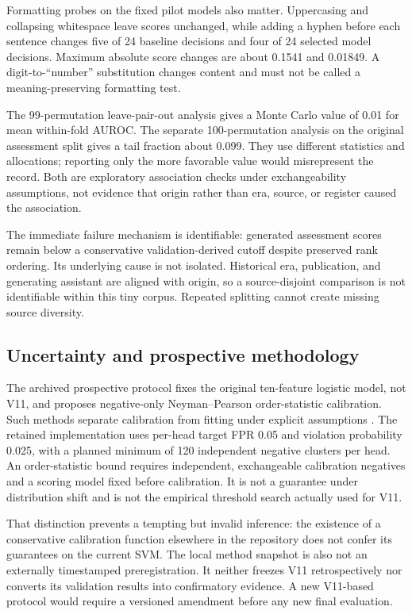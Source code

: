 \documentclass[11pt]{article}
\begin{document}
Formatting probes on the fixed pilot models also matter. Uppercasing and
collapsing whitespace leave scores unchanged, while adding a hyphen before
each sentence changes five of 24 baseline decisions and four of 24 selected
model decisions. Maximum absolute score changes are about 0.1541 and 0.01849.
A digit-to-``number'' substitution changes content and must not be called
a meaning-preserving formatting test.

The 99-permutation leave-pair-out analysis gives a Monte Carlo value of
0.01 for mean within-fold AUROC. The separate 100-permutation analysis on
the original assessment split gives a tail fraction about 0.099. They use
different statistics and allocations; reporting only the more favorable
value would misrepresent the record. Both are exploratory association checks
under exchangeability assumptions, not evidence that origin rather than
era, source, or register caused the association.

The immediate failure mechanism is identifiable: generated assessment
scores remain below a conservative validation-derived cutoff despite
preserved rank ordering. Its underlying cause is not isolated. Historical
era, publication, and generating assistant are aligned with origin, so a
source-disjoint comparison is not identifiable within this tiny corpus.
Repeated splitting cannot create missing source diversity.

\subsection{Uncertainty and prospective methodology}
The archived prospective protocol fixes the original ten-feature logistic
model, not V11, and proposes negative-only Neyman--Pearson order-statistic
calibration. Such methods separate calibration from fitting under explicit
assumptions \cite{tong2018}. The retained implementation uses per-head
target FPR 0.05 and violation probability 0.025, with a planned minimum of
120 independent negative clusters per head. An order-statistic bound requires
independent, exchangeable calibration negatives and a scoring model fixed
before calibration. It is not a guarantee under distribution shift and is
not the empirical threshold search actually used for V11.

That distinction prevents a tempting but invalid inference: the existence
of a conservative calibration function elsewhere in the repository does
not confer its guarantees on the current SVM. The local method snapshot
is also not an externally timestamped preregistration. It neither freezes
V11 retrospectively nor converts its validation results into confirmatory
evidence. A new V11-based protocol would require a versioned amendment
before any new final evaluation.
\end{document}
